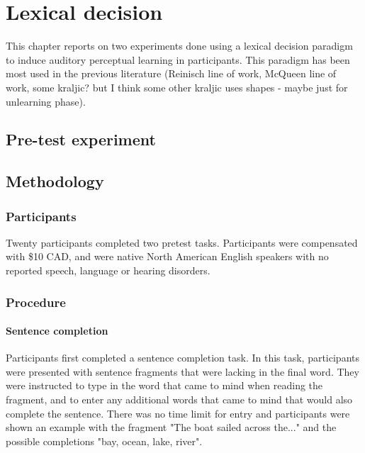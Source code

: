 
\chapter{Lexical decision}

This chapter reports on two experiments done using a lexical decision paradigm to induce auditory perceptual learning in participants.  This paradigm has been most used in the previous literature (Reinisch line of work, McQueen line of work, some kraljic? but I think some other kraljic uses shapes - maybe just for unlearning phase).

\section{Pre-test experiment}

\section{Methodology}

\subsection{Participants}

Twenty participants completed two pretest tasks. Participants were compensated with \$10 CAD, and were native North American English speakers with no reported speech, language or hearing disorders.

\subsection{Procedure}

\subsubsection{Sentence completion}

Participants first completed a sentence completion task.  In this task, participants were presented with sentence fragments that were lacking in the final word.  They were instructed to type in the word that came to mind when reading the fragment, and to enter any additional words that came to mind that would also complete the sentence.  There was no time limit for entry and participants were shown an example with the fragment "The boat sailed across the..." and the possible completions "bay, ocean, lake, river".

